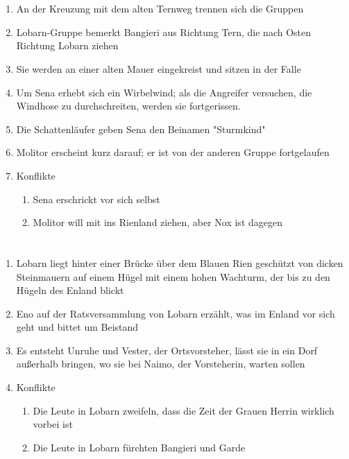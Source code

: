 \documentclass[12pt,a4paper,onecolumn,oneside,ngerman]{book}
\newcommand{\Tern}{Tern}
\newcommand{\Molitor}{Molitor}
\newcommand{\Ternweg}{{\Tern}weg}
\newcommand{\Sena}{Sena}
\newcommand{\Sturmkind}{Sturmkind}
\newcommand{\Bangiri}{Bangieri}
\newcommand{\Enland}{Enland}
\newcommand{\Schattenlaufer}{Schattenläufer}
\newcommand{\Eno}{Eno}
\newcommand{\Nox}{Nox}
\newcommand{\Lobarn}{Lobarn}
\newcommand{\Vester}{Vester}
\newcommand{\Naimo}{Naimo}
\newcommand{\Rhinland}{Rienland}
\newcommand{\Rhin}{Rien}
\begin{document}
\chapter[Der Weg nach Norden]{}
\begin{enumerate}
  \item An der Kreuzung mit dem alten {\Ternweg} trennen sich die Gruppen
  \item {\Lobarn}-Gruppe bemerkt {\Bangiri} aus Richtung {\Tern}, die nach Osten Richtung {\Lobarn} ziehen
  \item Sie werden an einer alten Mauer eingekreist und sitzen in der Falle
  \item Um {\Sena} erhebt sich ein Wirbelwind; als die Angreifer versuchen, die Windhose zu durchschreiten, werden sie fortgerissen. 
  \item Die {\Schattenlaufer} geben {\Sena} den Beinamen "{\Sturmkind}"
  \item {\Molitor} erscheint kurz darauf; er ist von der anderen Gruppe fortgelaufen
  \item Konflikte
  \begin{enumerate}
    \item {\Sena} erschrickt vor sich selbst
    \item {\Molitor} will mit ins {\Rhinland} ziehen, aber {\Nox} ist dagegen
  \end{enumerate}
\end{enumerate}

\chapter[Neuigkeiten]{}
\begin{enumerate}
  \item {\Lobarn} liegt hinter einer Brücke über dem Blauen {\Rhin} geschützt von dicken Steinmauern auf einem Hügel mit einem hohen Wachturm, der bis zu den Hügeln des {\Enland} blickt
  \item {\Eno} auf der Ratsversammlung von {\Lobarn} erzählt, was im {\Enland} vor sich geht und bittet um Beistand
  \item Es entsteht Unruhe und {\Vester}, der Ortsvorsteher, lässt sie in ein Dorf außerhalb bringen, wo sie bei {\Naimo}, der Vorsteherin, warten sollen
  \item Konflikte
  \begin{enumerate}
    \item Die Leute in {\Lobarn} zweifeln, dass die Zeit der Grauen Herrin wirklich vorbei ist
    \item Die Leute in {\Lobarn} fürchten {\Bangiri} und Garde
  \end{enumerate}
\end{enumerate}
\end{document}
